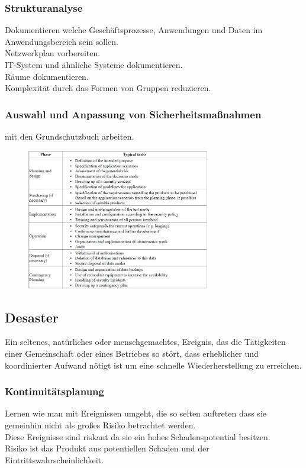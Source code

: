 \documentclass{article} %
\begin{document}
\subsubsection{Strukturanalyse}
Dokumentieren welche Geschäftsprozesse, Anwendungen und Daten im Anwendungsbereich sein sollen.\\
Netzwerkplan vorbereiten.\\
IT-System und ähnliche Systeme dokumentieren.\\
Räume dokumentieren.\\
Komplexität durch das Formen von Gruppen reduzieren.
\subsubsection{Auswahl und Anpassung von Sicherheitsmaßnahmen}
mit den Grundschutzbuch arbeiten.\\
\begin{figure}[h]
	\centering
		\includegraphics[width=8cm]{img/Grundschutz.JPG}
	\label{fig:Grundschutz}
\end{figure}
\subsection{Desaster}
Ein seltenes, natürliches oder menschgemachtes, Ereignis, das die Tätigkeiten einer Gemeinschaft oder eines Betriebes so stört, dass erheblicher und koordinierter Aufwand nötigt ist um eine schnelle Wiederherstellung zu erreichen.
\subsubsection{Kontinuitätsplanung}
Lernen wie man mit Ereignissen umgeht, die so selten auftreten dass sie gemeinhin nicht als großes Risiko betrachtet werden.\\
Diese Ereignisse sind riskant da sie ein hohes Schadenspotential besitzen.\\
Risiko ist das Produkt aus potentiellen Schaden und der Eintrittswahrscheinlichkeit.\\
\end{document}
